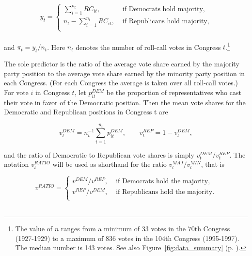 \begin{equation*}
y_t =
\begin{cases} \sum_{i=1}^{n_t} RC_{it}, & \text{ if Democrats hold majority}, \\[10pt]
n_t - \sum_{i=1}^{n_t} RC_{it}, & \text{ if Republicans hold majority,} \\
\end{cases}
\end{equation*}
~\\[-12pt]
 
\noindent and $\pi_t = y_t / n_t$. Here $n_t$ denotes the number of roll-call votes in Congress $t$.\footnote{The value of $n$ ranges from a minimum of 33 votes in the 70th Congress (1927-1929) to a maximum of 836 votes in the 104th Congress (1995-1997). The median number is 143 votes. See also Figure~\ref{fig:data_summary} (p. \pageref{fig:data_summary}).} 


The sole predictor is the ratio of the average vote share earned by the majority party position to the average vote share earned by the minority party position in each Congress.  (For each Congress the average is taken over all roll-call votes.)  For vote $i$ in Congress $t$, let $p_{it}^{DEM}$ be the proportion of representatives who cast their vote in favor of the Democratic position.  Then the mean vote shares for the Democratic and Republican positions in Congress t are

\begin{equation*}
v_t^{DEM} = n_t^{-1} \sum_{i=1}^{n_t} p_{it}^{DEM}, \qquad v_t^{REP} = 1 - v_t^{DEM},
\end{equation*}

\noindent and the ratio of Democratic to Republican vote shares is simply $v_t^{DEM} / v_t^{REP}$. The notation $v_t^{RATIO}$ will be used as shorthand for the ratio $v_t^{MAJ} / v_t^{MIN}$, that is 

\begin{equation*}
v^{RATIO} = 
\begin{cases} 
v^{DEM} / v^{REP}, & \text{ if Democrats hold the majority,} \\[10pt]
v^{REP} / v^{DEM}, & \text{ if Republicans hold the majority.} \\
\end{cases}
\end{equation*}
~\\[-12pt]


